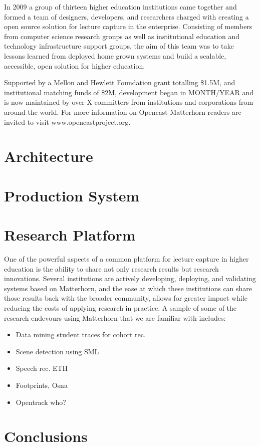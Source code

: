 \documentclass{sig-alternate}
\begin{document}
In 2009 a group of thirteen higher education institutions came together and formed a team of designers, developers, and researchers charged with creating a open source solution for lecture capture in the enterprise.  Consisting of members from computer science research groups as well as institutional education and technology infrastructure support groups, the aim of this team was to take lessons learned from deployed home grown systems and build a scalable, accessible, open solution for higher education.

Supported by a Mellon and Hewlett Foundation grant totalling \$1.5M, and institutional matching funds of \$2M, development began in MONTH/YEAR and is now maintained by over X committers from institutions and corporations from around the world.  For more information on Opencast Matterhorn readers are invited to visit www.opencastproject.org.

\section{Architecture}
\section{Production System}
\section{Research Platform}
One of the powerful aspects of a common platform for lecture capture in higher education is the ability to share not only research results but research innovations.  Several institutions are actively developing, deploying, and validating systems based on Matterhorn, and the ease at which these institutions can share those results back with the broader community, allows for greater impact while reducing the costs of applying research in practice.
A sample of some of the research endevours using Matterhorn that we are familiar with includes:
\begin{itemize}
\item Data mining student traces for cohort rec.
\item Scene detection using SML
\item Speech rec. ETH
\item Footprints, Osna
\item Opentrack who?
\end{itemize}

\section{Conclusions}
\end{document}
